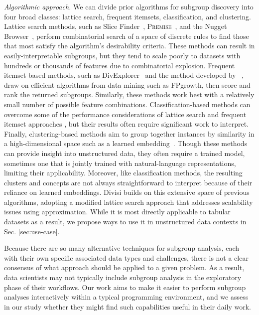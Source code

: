 \textit{Algorithmic approach.} We can divide prior algorithms for subgroup discovery into four broad classes: lattice search, frequent itemsets, classification, and clustering.
Lattice search methods, such as Slice Finder~\cite{chung_slice_2020,sagadeeva_sliceline_2021}, \textsc{Premise}~\cite{hedderich_label-descriptive_2022}, and the Nugget Browser~\cite{guo_nugget_2011}, perform combinatorial search of a space of discrete rules to find those that most satisfy the algorithm's desirability criteria.
These methods can result in easily-interpretable subgroups, but they tend to scale poorly to datasets with hundreds or thousands of features due to combinatorial explosion.
Frequent itemset-based methods, such as DivExplorer~\cite{pastor_looking_2021} and the method developed by \citeauthor{suzuki_rule_2023}~\cite{suzuki_rule_2023}, draw on efficient algorithms from data mining such as FPgrowth, then score and rank the returned subgroups.
Similarly, these methods work best with a relatively small number of possible feature combinations.
Classification-based methods can overcome some of the performance considerations of lattice search and frequent itemset approaches \cite{yuan_isea_2022,yuan_visual_2022}, but their results often require significant work to interpret.
Finally, clustering-based methods aim to group together instances by similarity in a high-dimensional space such as a learned embedding~\cite{zhang_manifold_2019,eyuboglu_domino_2022,kim_interpretability_2018}.
Though these methods can provide insight into unstructured data, they often require a trained model, sometimes one that is jointly trained with natural-language representations, limiting their applicability.
Moreover, like classification methods, the resulting clusters and concepts are not always straightforward to interpret because of their reliance on learned embeddings.
Divisi builds on this extensive space of previous algorithms, adopting a modified lattice search approach that addresses scalability issues using approximation.
While it is most directly applicable to tabular datasets as a result, we propose ways to use it in unstructured data contexts in Sec. \ref{sec:use-case}.

Because there are so many alternative techniques for subgroup analysis, each with their own specific associated data types and challenges, there is not a clear consensus of what approach should be applied to a given problem.
As a result, data scientists may not typically include subgroup analysis in the exploratory phase of their workflows.
Our work aims to make it easier to perform subgroup analyses interactively within a typical programming environment, and we assess in our study whether they might find such capabilities useful in their daily work.

